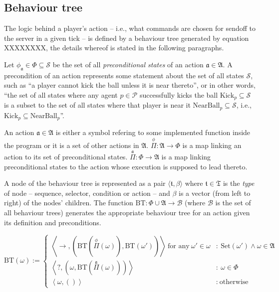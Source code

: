 \documentclass[10pt,a4paper]{article}
\begin{document}
\subsection{Behaviour tree}
The logic behind a player's action -- i.e., what commands are chosen for sendoff to the server in a given tick -- is defined by a behaviour tree generated by equation XXXXXXXX, the details whereof is stated in the following paragraphs.

Let \(\phi_\mathfrak{a}\in\Phi\subseteq\mathcal{S}\) be the set of all \textit{preconditional states} of an action \(\mathfrak{a}\in\mathfrak{A}\). A precondition of an action represents some statement about the set of all states \(\mathcal{S}\), such as ``a player cannot kick the ball unless it is near thereto'', or in other words, ``the set of all states where any agent \(p\in\mathcal{P}\) successfully kicks the ball \(\text{Kick}_p \subseteq \mathcal{S}\) is a subset to the set of all states where that player is near it \(\text{NearBall}_p \subseteq \mathcal{S}\), i.e., \(\text{Kick}_p \subseteq \text{NearBall}_p\)''.

An action \(\mathfrak{a}\in\mathfrak{A}\) is either a symbol refering to some implemented function inside the program or it is a set of other actions in \(\mathfrak{A}\). \(\overset{\phi}\Pi : \mathfrak{A} \to \Phi\) is a map linking an action to its set of preconditional states. \(\overset{\mathfrak{a}}\Pi : \Phi \to \mathfrak{A}\) is a map linking preconditional states to the action whose execution is supposed to lead thereto.

A node of the behaviour tree is represented as a pair \(\langle \mathfrak{t}, \beta \rangle\) where \(\mathfrak{t}\in\mathfrak{T}\) is the \textit{type} of node -- sequence, selector, condition or action -- and \(\beta\) is a vector (from left to right) of the nodes' children. The function \(\text{BT}:\Phi\cup\mathfrak{A} \to \mathscr{B}\) (where \(\mathscr{B}\) is the set of all behaviour trees) generates the appropriate behaviour tree for an action given its definition and preconditions.

\begin{equation}
		\text{BT}(\omega) := \left\{
			\begin{array}{cl}
					\left\langle \boxed{\to}, \left(\text{BT}\left(\overset{\mathfrak{\phi}} \Pi (\omega)\right), \text{BT}(\omega')\right) \right\rangle \ \text{for any}\  \omega' \in \omega & : \ \text{Set}(\omega') \wedge \omega\in\mathfrak{A} \\
					\left\langle \boxed{?}, \left(\omega,\text{BT}\left(\overset{\mathfrak{a}} \Pi (\omega)\right)\right) \right\rangle & : \ \omega\in\Phi \\
					\left\langle \omega, () \right\rangle & : \ \text{otherwise}
			\end{array}
		\right.
\end{equation}
\end{document}

